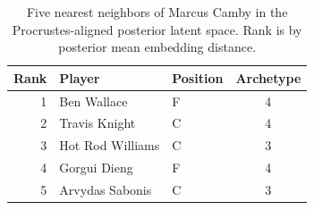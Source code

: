 \begin{table}[htbp]
  \centering\small
  \begin{tabular}{rllc}
    \toprule
    Rank & Player & Position & Archetype \\
    \midrule
    1 & Ben Wallace & F & 4 \\
    2 & Travis Knight & C & 4 \\
    3 & Hot Rod Williams & C & 3 \\
    4 & Gorgui Dieng & F & 4 \\
    5 & Arvydas Sabonis & C & 3 \\
    \bottomrule
  \end{tabular}
  \caption{Five nearest neighbors of Marcus Camby in the Procrustes-aligned posterior latent space. Rank is by posterior mean embedding distance.}
  \label{tab:Marcus_Camby_neighbors}
\end{table}

